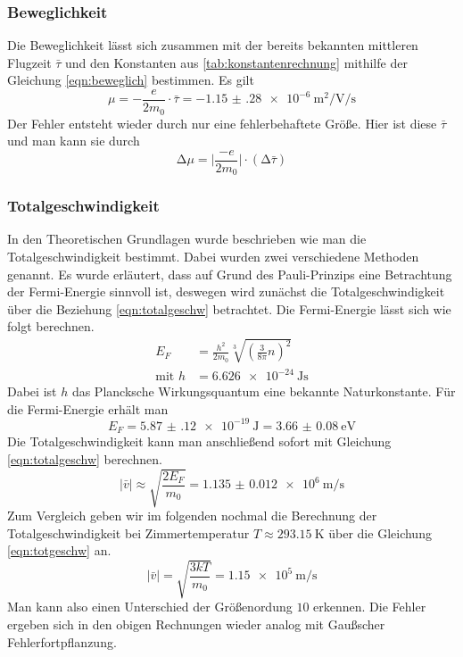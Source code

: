 \subsubsection{Beweglichkeit}
Die Beweglichkeit lässt sich zusammen mit der bereits bekannten mittleren Flugzeit $\bar{\tau}$ und den Konstanten aus \ref{tab:konstantenrechnung} mithilfe
der Gleichung \eqref{eqn:beweglich} bestimmen.
Es gilt
\begin{equation}
\mu = - \frac{e}{2 m_{0}} \cdot \bar{\tau} = \SI{-1.15(28)e-6}{\meter\squared\per\volt\per\second}
\end{equation}
Der Fehler entsteht wieder durch nur eine fehlerbehaftete Größe. Hier ist diese $\bar{\tau}$ und man kann sie durch
\begin{equation}
\increment \mu = \biggl| \frac{-e}{2m_{0}}\biggr| \cdot (\increment \bar{\tau})
\end{equation}

\subsubsection{Totalgeschwindigkeit}
In den Theoretischen Grundlagen wurde beschrieben wie man die Totalgeschwindigkeit bestimmt. Dabei wurden zwei verschiedene Methoden genannt. 
Es wurde erläutert, dass auf Grund des Pauli-Prinzips eine Betrachtung der Fermi-Energie sinnvoll ist, deswegen wird zunächst die Totalgeschwindigkeit über die Beziehung \eqref{eqn:totalgeschw}
betrachtet.
Die Fermi-Energie lässt sich wie folgt berechnen.
\begin{align}
E_{F} &= \frac{h^{2}}{2 m_{0}} \sqrt[3]{\left( \frac{3}{8\pi} n \right)^{2}} \\[0.5em]
\text{mit  } h &= \SI{6.626e-24}{\joule\second}
\end{align}
Dabei ist $h$ das Plancksche Wirkungsquantum eine bekannte Naturkonstante.
Für die Fermi-Energie erhält man
\begin{equation}
E_{F}= \SI{5.87(12)e-19}{\joule} = \SI{3.66(8)}{\electronvolt}
\end{equation}
Die Totalgeschwindigkeit kann man anschließend sofort mit Gleichung \eqref{eqn:totalgeschw} berechnen.
\begin{equation}
\lvert \bar{v} \rvert \approx \sqrt{\frac{2 E_{F}}{m_{0}}} = \SI{1.135(12)e6}{\meter\per\second}
\end{equation}
Zum Vergleich geben wir im folgenden nochmal die Berechnung der Totalgeschwindigkeit bei Zimmertemperatur $T \approx \SI{293.15}{\kelvin}$ über die 
Gleichung \eqref{eqn:totgeschw} an.
\begin{equation}
\lvert \bar{v} \rvert = \sqrt{\frac{3kT}{m_{0}}} = \SI{1.15e5}{\meter\per\second}
\end{equation}
Man kann also einen Unterschied der Größenordung $10$ erkennen.
Die Fehler ergeben sich in den obigen Rechnungen wieder analog mit Gaußscher Fehlerfortpflanzung.

